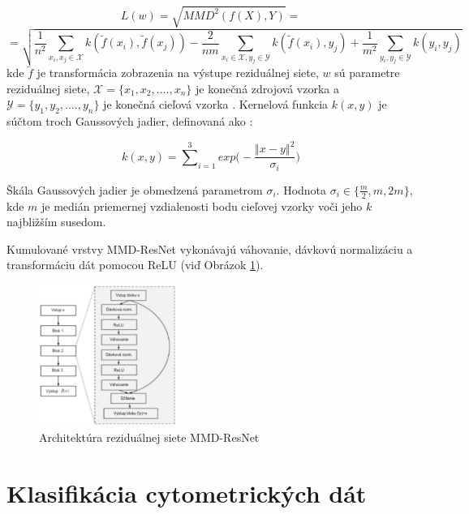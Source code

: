 \begin{equation}
    L(w) = \sqrt{MMD^2(f(X), Y)} = 
\end{equation}
\[
= \sqrt{\frac{1}{n^2}\sum_{x_i, x_j \in \mathcal{X}}^{}{k(\tilde{f}(x_i),\tilde{f}(x_j))} - 
\frac{2}{nm}\sum_{x_i \in \mathcal{X}, y_j \in \mathcal{Y}}^{}{k(\tilde{f}(x_i),y_j)} +
\frac{1}{m^2}\sum_{y_i, y_j \in \mathcal{Y}}^{}{k(y_i,y_j)}
}
\]
kde $\tilde{f}$ je transformácia zobrazenia na výstupe reziduálnej siete, $w$ sú parametre reziduálnej siete, $\mathcal{X} = \{x_1, x_2, .... , x_n\}$ je konečná zdrojová vzorka a $\mathcal{Y} = \{y_1, y_2, .... , y_n\}$ je konečná cieľová vzorka \cite{Li2017}. Kernelová funkcia $k(x, y)$ je súčtom troch Gaussových jadier, definovaná ako \cite{Li2017}:

\begin{equation}
\label{kernel_funct}
k(x,y) = {\sum^3}_{i=1}exp\bigg(-\frac{{\left\Vert x-y \right\Vert}^2}{\sigma_i}\bigg)
\end{equation}

Škála Gaussových jadier je obmedzená parametrom $\sigma_i$. Hodnota $\sigma_i \in \{\frac{m}{2}, m, 2m\}$, kde $m$ je medián priemernej vzdialenosti bodu cieľovej vzorky voči jeho $k$ najbližším susedom.

Kumulované vrstvy MMD-ResNet vykonávajú váhovanie, dávkovú normalizáciu a transformáciu dát pomocou ReLU (viď Obrázok \ref{MMD-ResNet_arch}). 

\begin{figure}
\centerline{\includegraphics[width=0.4\textwidth]{images/MMD-ResNet_arch.png}}
\caption[Architektúra MMD-ResNet]{Architektúra reziduálnej siete MMD-ResNet}
\label{MMD-ResNet_arch}
\end{figure}



\section{Klasifikácia cytometrických dát}
\label{feed-forward-classifikator}


